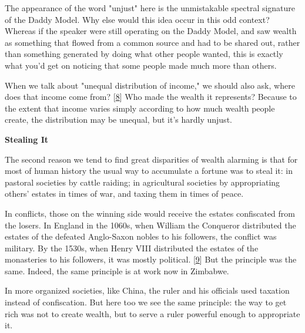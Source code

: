 The appearance of the word "unjust" here
                  is the unmistakable spectral signature of the Daddy Model. Why
                  else would this idea occur in this odd context? Whereas if the
                  speaker were still operating on the Daddy Model, and saw
                  wealth as something that flowed from a common source and had
                  to be shared out, rather than something generated by doing
                  what other people wanted, this is exactly what you'd get on
                  noticing that some people made much more than others.

When
                  we talk about "unequal distribution of income," we should also
                  ask, where does that income come from?
                  [\href{\#f8n}{8}]
                  Who made the wealth it represents? Because to the extent that
                  income varies simply according to how much wealth people
                  create, the distribution may be unequal, but it's hardly
                  unjust.

\textbf{Stealing It}

The second
                  reason we tend to find great disparities of wealth alarming is
                  that for most of human history the usual way to accumulate a
                  fortune was to steal it: in pastoral societies by cattle
                  raiding; in agricultural societies by appropriating others'
                  estates in times of war, and taxing them in times of peace.

In
                  conflicts, those on the winning side would receive the estates
                  confiscated from the losers. In England in the 1060s, when
                  William the Conqueror distributed the estates of the defeated
                  Anglo-Saxon nobles to his followers, the conflict was
                  military. By the 1530s, when Henry VIII distributed the
                  estates of the monasteries to his followers, it was mostly
                  political.
                  [\href{\#f9n}{9}]
                  But the principle was the same. Indeed, the same principle is
                  at work now in Zimbabwe.

In more organized
                  societies, like China, the ruler and his officials used
                  taxation instead of confiscation. But here too we see the same
                  principle: the way to get rich was not to create wealth, but
                  to serve a ruler powerful enough to appropriate it.


